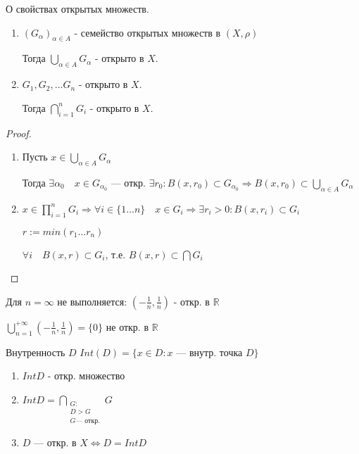\begin{theorem}
    О свойствах открытых множеств.

    \begin{enumerate}
        \item $(G_\alpha)_{\alpha\in A}$ - семейство открытых множеств в $(X,\rho)$
        
        Тогда $\bigcup_{\alpha\in A} G_\alpha$ - открыто в $X$.

        \item $G_1,G_2,\ldots G_n$ - открыто в $X$.
        
        Тогда $\bigcap_{i=1}^{n} G_i$ - открыто в $X$.
    \end{enumerate}

\end{theorem}

\begin{proof}
    \begin{enumerate}
        \item Пусть $x\in \bigcup_{\alpha\in A} G_\alpha$
        
        Тогда $\exists \alpha_0 \quad x\in G_{\alpha_0}$ --- откр. $\exists r_0 : B(x,r_0)\subset G_{\alpha_0} \Rightarrow B(x,r_0)\subset\bigcup_{\alpha\in A} G_\alpha$

        \item $x\in \prod_{i=1}^n G_i \Rightarrow \forall i\in\{1\ldots n\} \quad x\in G_i \Rightarrow \exists r_i>0 : B(x,r_i)\subset G_i$
        
        $r:=min(r_1\ldots r_n)$

        $\forall i \quad B(x,r)\subset G_i$, т.е. $B(x,r)\subset\bigcap G_i$
    \end{enumerate}
\end{proof}

\begin{remark}
    Для $n=\infty$ не выполняется: $(-\frac{1}{n},\frac{1}{n})$ - откр. в $\mathbb{R}$

    $\bigcup_{n=1}^{+\infty}(-\frac{1}{n},\frac{1}{n})=\{0\}$ не откр. в $\mathbb{R}$
\end{remark}

\begin{definition}
    Внутренность $D$ $Int(D)=\{x\in D : x \text{ --- внутр. точка }D\}$
\end{definition}

\begin{remark}
    \begin{enumerate}
        \item $Int D$ - откр. множество
        \item $Int D=\bigcap\limits_{\substack{G: \\ D>G \\ G \text{--- откр.}}} G$
        \item $D$ --- откр. в $X \Leftrightarrow D=Int D$
    \end{enumerate}
\end{remark}

